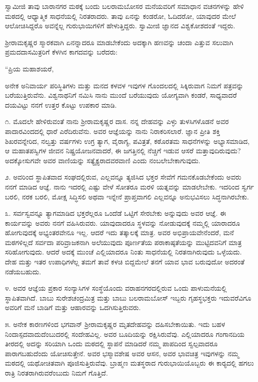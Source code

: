  ಸ್ವಾಮೀಜಿ ತಾವು ಬಾರಾನಗರ ಮಠಕ್ಕೆ ಬಂದು ಬಲರಾಮಬೋಸರ ಮನೆಯವರಿಗೆ ಸಮಾಧಾನ ವಚನಗಳನ್ನು ಹೇಳಿ ಮಠದಲ್ಲಿ ಆಧ್ಯಾತ್ಮಿಕ ಸಾಧನೆಯಲ್ಲಿ ನಿರತರಾದರು. ತಾವು ಏನನ್ನು ಕಂಡರೋ, ಓದಿದರೋ, ಯಾವುದರ ಮೇಲೆ ಆಲೋಚಿಸಿದ್ದರೊ ಅವನ್ನೆಲ್ಲ ಗುರುಭಾಯಿಗಳಿಗೆ ಹೇಳುತ್ತಿದ್ದರು. ಸ್ವಾಮೀಜಿ ಜ್ಞಾನದ ವಿಶ್ವಕೋಶದಂತೆ ಇದ್ದರು. 

 ಶ‍್ರೀರಾಮಕೃಷ್ಣರ ಸ್ಮಾರಕವಾಗಿ ಏನನ್ನಾದರೂ ಮಾಡಬೇಕೆಂದು ಅದಕ್ಕಾಗಿ ಹಣವನ್ನು ಚಂದಾ ಎತ್ತುವ ಸಲುವಾಗಿ ಪ್ರಮದದಾಸಮಿತ್ರರಿಗೆ ಕೆಳಗಿನ ಕಾಗದವನ್ನು ಬರೆದರು: 

 “ಪ್ರಿಯ ಮಹಾಶಯರೆ, 

 ಅನೇಕ ಅನಿವಾರ್ಯ ಪರಿಸ್ಥಿತಿಗಳು ಮತ್ತು ಮನದ ಕಳವಳ ಇವುಗಳ ಗೊಂದಲದಲ್ಲಿ ಸಿಕ್ಕಿರುವಾಗ ನಿಮಗೆ ಪತ್ರವನ್ನು ಬರೆಯುತ್ತಿರುವೆನು. ವಿಶ್ವನಾಥನಿಗೆ ನಮಿಸಿ ನಾನು ಮುಂದೆ ಬರೆಯುವುದು ಯೋಗ್ಯವಾಗಿ ಕಂಡರೆ, ಸಾಧ್ಯವಾದರೆ ದಯವಿಟ್ಟು ನನಗೆ ಉತ್ತರ ಕೊಟ್ಟು ಉಪಕಾರ ಮಾಡಿ. 

 ೧. ಮೊದಲೇ ಹೇಳಿರುವಂತೆ ನಾನು ಶ‍್ರೀರಾಮಕೃಷ್ಣರ ದಾಸ. ನನ್ನ ದೇಹವನ್ನು ಎಳ್ಳು ತುಳಸಿಗಳೊಡನೆ ಅವರ ಪಾದಾರವಿಂದದಲ್ಲಿ ಧಾರೆ ಎರೆದಿರುವೆನು. ಅವರ ಆಜ್ಞೆಯನ್ನು ನಾನು ನಿರಾಕರಿಸಲಾರೆ. ಜ್ಞಾನ ಪ್ರೀತಿ ಶಕ್ತಿ ಶಿಖರವನ್ನೇರಿದ, ನಲ್ವತ್ತು ವರ್ಷಗಳು ಉಗ್ರ ತ್ಯಾಗ, ವೈರಾಗ್ಯ, ಪವಿತ್ರತೆ, ಕಠೊರತಮ ಸಾಧನೆಗಳನ್ನು ಅಭ್ಯಾಸಮಾಡಿದ, ಆ ಮಹಾತಪಸ್ವಿಗಳ ಜೀವನ ನಿಷ್ಪ್ರಯೋಜನವಾದರೆ, ಈ ಜಗತ್ತಿನಲ್ಲಿ ನೆಚ್ಚಿಗೆ ಇಡುವ ಆಸರೆ ಮತ್ತಾವುದಿರುವುದು? ಅದಕ್ಕೋಸುಗವೇ ಅವರ ವಾಣಿಯನ್ನು ಸತ್ಯೈಕ್ಯರಾದವರವಾಣಿ ಎಂದು ನಂಬಲೇಬೇಕಾಗುವುದು. 

 ೨. ಅವರಿಂದ ಸ್ಥಾಪಿತವಾದ ಸಂಘದಲ್ಲಿರುವ, ಎಲ್ಲವನ್ನೂ ತ್ಯಜಿಸಿದ ಭಕ್ತರ ಸೇವೆಗೆ ಗಮನಕೊಡಬೇಕೆಂದು ಅವರು ನನಗೆ ಮಾಡಿದ ಆಜ್ಞೆ. ನಾನು ಇದರಲ್ಲಿ ಎಷ್ಟು ವೇಳೆ ಸೋತರೂ ಮರಳಿ ಯತ್ನವನ್ನು ಮಾಡಲೇಬೇಕು. ಇದರಿಂದ ಸ್ವರ್ಗ ಬರಲಿ, ನರಕ ಬರಲಿ, ಮೋಕ್ಷ ಸಿದ್ಧಿಸಲಿ ಅಥವಾ ಇನ್ನೇನೆ ಪ್ರಾಪ್ತವಾಗಲಿ ಎಲ್ಲವನ್ನೂ ಅನುಭವಿಸಲು ಸಿದ್ಧನಾಗಿರಬೇಕು. 

 ೩. ಸರ್ವಸ್ವವನ್ನೂ ತ್ಯಾಗಮಾಡಿದ ಭಕ್ತರೆಲ್ಲರೂ ಒಂದೆಡೆ ಒಟ್ಟಿಗೆ ಸೇರಬೇಕು ಅನ್ನುವುದು ಅವರ ಆಜ್ಞೆ. ಈ ಕಾರ್ಯವನ್ನು ಅವರು ನನಗೆ ವಹಿಸಿರುವರು. ಯಾವುದಾದರೂ ಸ್ಥಳವನ್ನು ನೋಡುವುದಕ್ಕೆ ನಮ್ಮಲ್ಲಿ ಯಾರಾದರೂ ಹೋಗುವುದಕ್ಕೆ ಅಭ್ಯಂತರವೇನೂ ಇಲ್ಲ. ಆದರೆ ಇದು ತತ್ಕಾಲಕ್ಕೆ ಮಾತ್ರ. ಅವರ ಅಭಿಪ್ರಾಯವೇನೆಂದರೆ, ಮನೆ ಮಠಗಳಿಲ್ಲದೆ ಸರ್ವದಾ ಪರಿವ್ರಾಜಕನಾಗಿ ಅಲೆಯುವುದು ಪೂರ್ಣತೆಯ ಪರಾಕಾಷ್ಠತೆಯನ್ನು ಮುಟ್ಟಿದವನಿಗೆ ಮಾತ್ರ ಸರಿಹೋಗುವುದು. ಆದರೆ ಅದಕ್ಕೆ ಮುಂಚೆ ಎಲ್ಲಿಯಾದರೂ ನಿಂತು ಸಾಧನೆಯಲ್ಲಿ ನಿರತನಾಗಿರುವುದು ಒಳ್ಳೆಯದು. ದೇಹ ಮತ್ತು ಇತರ ಉಪಾಧಿಗಳೆಲ್ಲ ತಮಗೆ ತಾವೆ ಕಳಚಿ ಬಿದ್ದಮೇಲೆ ತನಗೆ ಯಾವ ಭಾವ ಬರುವುದೋ ಅದರಂತೆ ನಡೆಯಬಹುದು. 

 ೪. ಅವರ ಆಜ್ಞೆಯ ಪ್ರಕಾರ ಸಂನ್ಯಾಸಿಗಳ ಸಂಸ್ಥೆಯೊಂದು ವರಾಹನಗರದಲ್ಲಿರುವ ಒಂದು ಪಾಳುಮನೆಯಲ್ಲಿ ಸ್ಥಾಪಿತವಾಗಿದೆ. ಬಾಬು ಸುರೇಶಚಂದ್ರಮಿತ್ರ ಮತ್ತು ಬಾಬು ಬಲರಾಮಬೋಸ್ ಇಬ್ಬರು ಗೃಹಸ್ಥಭಕ್ತರು ಇದುವರೆವಿಗೂ ಅವರಿಗೆ ಮನೆ ಬಾಡಿಗೆ ಮತ್ತು ಆಹಾರವನ್ನು ಒದಗಿಸುತ್ತಿರುವರು. 

 ೫. ಅನೇಕ ಕಾರಣಗಳಿಂದ ಭಗವಾನ್ ಶ‍್ರೀರಾಮಕೃಷ್ಣರ ಮೃತದೇಹವನ್ನು ದಹಿಸಬೇಕಾಯಿತು. ಇದು ಬಹಳ ನಿಂದಾಸ್ಪದವಾದುದೆಂಬುದರಲ್ಲಿ ಸಂದೇಹವಿಲ್ಲ. ಅವರ ಬೂದಿಯನ್ನು ರಕ್ಷಿಸಿರುವೆವು. ಎಲ್ಲಿಯಾದರೂ ಗಂಗಾನದಿಯ ತೀರದಲ್ಲಿ ಅದನ್ನು ಸರಿಯಾಗಿ ಒಂದು ಮಠದಲ್ಲಿ ಸ್ಥಾಪನೆ ಮಾಡಿದರೆ ನಮ್ಮ ಪಾಪದಿಂದ ಸ್ವಲ್ಪವಾದರೂ ಪಾರಾಗಬಹುದೆಂದು ಯೋಚಿಸುತ್ತೇನೆ. ಅವರ ಭಸ್ಮಾವಶೇಷ ಅವರ ಆಸನ, ಅವರ ಭಾವಚಿತ್ರ ಇವುಗಳನ್ನು ನಮ್ಮ ಮಠದಲ್ಲಿ ಯಥೋಚಿತವಾಗಿ ಪೂಜಿಸುತ್ತಿರುವೆವು. ಬ್ರಾಹ್ಮಣ ಮತಸ್ಥರಾದ ಗುರುಭಾಯಿಯೊಬ್ಬರು ಈ ಕಾರ‍್ಯದಲ್ಲಿ ಹಗಲು ರಾತ್ರಿ ನಿರತರಾಗಿರುವರೆಂಬುದು ನಿಮಗೆ ಗೊತ್ತಿದೆ. 

